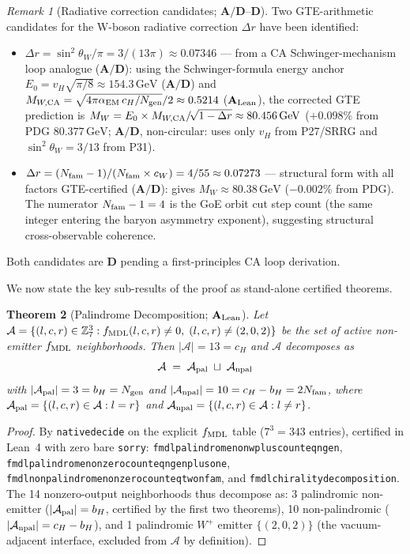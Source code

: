 \documentclass[11pt]{article}
\newtheorem{theorem}{Theorem}[section]
\theoremstyle{remark}
\newtheorem{remark}[theorem]{Remark}
\newcommand{\Ngen}{N_{\rm gen}}
\newcommand{\Nfam}{N_{\rm fam}}
\newcommand{\bH}{b_H}
\newcommand{\cH}{c_H}
\newcommand{\lean}[1]{%
  \penalty-100
  \begingroup\def\_{\textunderscore\allowbreak}\texttt{#1}\endgroup}
\newcommand{\sinwsq}{\sin^2\!\theta_W}
\newcommand{\CatAL}{\ensuremath{\textbf{A}_{\rm Lean}}}
\newcommand{\CatAD}{\textbf{A/D}}
\newcommand{\CatD}{\textbf{D}}
\begin{document}
\begin{remark}[Radiative correction candidates; $\CatAD$--$\CatD$]
\label{rem:delta_r_candidates}
Two GTE-arithmetic candidates for the W-boson radiative correction $\Delta r$ have been identified:
\begin{itemize}
\item $\Delta r = \sinwsq/\pi = 3/(13\pi) \approx 0.07346$ --- from a CA Schwinger-mechanism
loop analogue ($\CatAD$): using the Schwinger-formula energy anchor
$E_0 = v_H\sqrt{\pi/8} \approx 154.3\,\text{GeV}$ ($\CatAD$) and
$M_{W,\rm CA} = \sqrt{4\pi\alpha_{\rm EM}\,c_H/\Ngen}/2 \approx 0.5214$ ($\CatAL$),
the corrected GTE prediction is
$M_W = E_0 \times M_{W,\rm CA}/\!\sqrt{1-\Delta r}
\approx 80.456\,\text{GeV}$
($+0.098\%$ from PDG $80.377\,\text{GeV}$; $\CatAD$, non-circular: uses only
$v_H$ from P27/SRRG and $\sin^2\!\theta_W = 3/13$ from P31).
\item $\Delta r = (\Nfam-1)/(\Nfam \times c_W) = 4/55 \approx 0.07273$ --- structural form with
all factors GTE-certified ($\CatAD$): gives $M_W \approx 80.38\,\text{GeV}$ ($-0.002\%$ from
PDG). The numerator $\Nfam-1 = 4$ is the GoE orbit cut step count (the same integer
entering the baryon asymmetry exponent), suggesting structural cross-observable coherence.
\end{itemize}
Both candidates are $\CatD$ pending a first-principles CA loop derivation.
\end{remark}

\medskip

We now state the key sub-results of the proof as stand-alone certified theorems.

\begin{theorem}[Palindrome Decomposition; $\CatAL$]
\label{thm:palindrome}
Let $\mathcal{A} = \{(l,c,r) \in \mathbb{Z}_7^3 : f_{\rm MDL}(l,c,r) \neq 0,\;
(l,c,r) \neq (2,0,2)\}$ be the set of active non-emitter $f_{\rm MDL}$ neighborhoods.
Then $|\mathcal{A}| = 13 = \cH$ and $\mathcal{A}$ decomposes as
\begin{equation}
  \mathcal{A} \;=\; \mathcal{A}_{\rm pal} \;\sqcup\; \mathcal{A}_{\rm npal}
\end{equation}
with $|\mathcal{A}_{\rm pal}| = 3 = \bH = \Ngen$ and
$|\mathcal{A}_{\rm npal}| = 10 = \cH - \bH = 2\Nfam$, where
$\mathcal{A}_{\rm pal} = \{(l,c,r) \in \mathcal{A} : l = r\}$ and
$\mathcal{A}_{\rm npal} = \{(l,c,r) \in \mathcal{A} : l \neq r\}$.
\end{theorem}

\begin{proof}
By \lean{native\_decide} on the explicit $f_{\rm MDL}$ table ($7^3 = 343$ entries),
certified in Lean~4 with zero bare \texttt{sorry}:
\lean{fmdl\_palindrome\_nonwplus\_count\_eq\_ngen},
\lean{fmdl\_palindrome\_nonzero\_count\_eq\_ngen\_plus\_one},
\lean{fmdl\_nonpalindrome\_nonzero\_count\_eq\_two\_nfam}, and
\lean{fmdl\_chirality\_decomposition}.
The 14 nonzero-output neighborhoods thus decompose as: 3 palindromic non-emitter
($|\mathcal{A}_{\rm pal}| = \bH$, certified by the first two theorems),
10 non-palindromic ($|\mathcal{A}_{\rm npal}| = \cH - \bH$), and
1 palindromic $W^+$ emitter $\{(2,0,2)\}$ (the vacuum-adjacent interface,
excluded from $\mathcal{A}$ by definition).
\end{proof}
\end{document}
